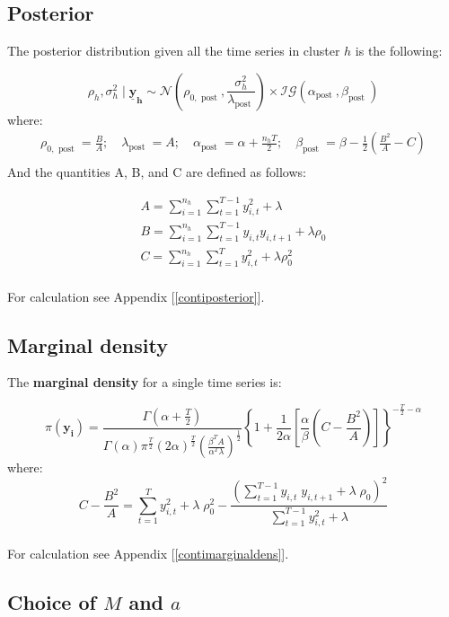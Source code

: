 \documentclass[12pt,a4paper]{article}
\begin{document}
\subsection{Posterior}\label{posterior}

The posterior distribution given all the time series in cluster $h$ is the following:

$$
\rho_{h}, \sigma_{h}^{2} \mid \boldsymbol{\underline{y}_h} \sim \mathcal{N}\left(\rho_{0, \text { post }}, \frac{\sigma_{h}^{2}}{\lambda_{\text {post }}}\right) \times \mathcal{I G}\left(\alpha_{\text {post }}, \beta_{\text {post }}\right)
$$
where:
$$
\begin{gathered}
\rho_{0, \text { post }}=\frac{B}{A} ; \quad \lambda_{\text {post }}=A ; \quad \alpha_{\text {post }}=\alpha+\frac{n_{h} T}{2} ; \quad \beta_{\text {post }}=\beta-\frac{1}{2}\left(\frac{B^{2}}{A}-C\right) \\
\end{gathered}
$$
And the quantities A, B, and C are defined as follows:

$$
\begin{gathered}
A=\sum_{i=1}^{n_{h}} \sum_{t=1}^{T-1} y_{i, t}^{2}+\lambda \\
B=\sum_{i=1}^{n_{h}} \sum_{t=1}^{T-1} y_{i, t} y_{i, t+1}+\lambda \rho_{0} \\
C=\sum_{i=1}^{n_{h}} \sum_{t=1}^{T} y_{i, t}^{2}+\lambda \rho_{0}^{2}
\end{gathered}
$$
\\
For calculation see Appendix [\ref{contiposterior}].

\subsection{Marginal density}\label{marginaldensity}


The \textbf{marginal density} for a single time series is:

$$
\pi(\boldsymbol{y_i}) = \frac{\Gamma(\alpha + \frac{T}{2})}{\Gamma(\alpha)\pi^{\frac{T}{2}}(2 \alpha)^{\frac{T}{2}} \left(\frac{\beta^T A}{\alpha^T \lambda}\right)^{\frac{1}{2}}}\left\{1+\frac{1}{2 \alpha}\left[\frac{\alpha}{\beta}\left(C-\frac{B^2}{A}\right)\right]\right\}^{-\frac{T}{2}-\alpha} 
$$
where:
$$
C-\frac{B^2}{A} =  \sum_{t=1}^{T} y_{i,t}^2 + \lambda \; \rho_0^2 - \frac{\left( \sum_{t=1}^{T-1} y_{i,t} \; y_{i,t+1} + \lambda \; \rho_0 \right)^2}{ \sum_{t=1}^{T-1} y_{i,t}^2 + \lambda}
$$
\\
For calculation see Appendix [\ref{contimarginaldens}].
\vfill
\subsection{Choice of $M$ and $a$}
\end{document}
